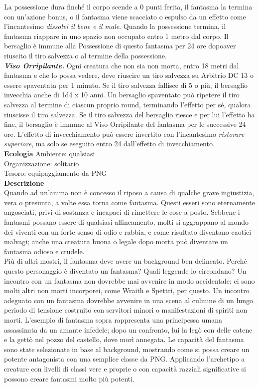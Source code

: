 \begin{multicols}{2}
La possessione dura finché il corpo scende a 0 punti ferita, il fantasma la termina con un'azione bonus, o il fantasma viene scacciato o espulso da un effetto come l'incantesimo \emph{dissolvi il bene e il male}. Quando la possessione termina, il fantasma riappare in uno spazio non occupato entro 1 metro dal corpo. Il bersaglio è immune alla Possessione di questo fantasma per 24 ore dopoaver riuscito il tiro  salvezza o al termine della possessione.\\

\emph{\textbf{Viso Orripilante.}} Ogni creatura che non sia non morta, entro 18 metri  dal fantasma e che lo possa vedere, deve riuscire un tiro salvezza su Arbitrio DC 13 o essere spaventata per 1 minuto. Se il tiro salvezza  fallisce di 5 o più, il bersaglio invecchia anche di 1d4 x 10 anni. Un  bersaglio spaventato può ripetere il tiro salvezza al termine di ciascun  proprio round, terminando l'effetto per sé, qualora riuscisse il tiro  salvezza. Se il tiro salvezza del bersaglio riesce e per lui l'effetto ha fine, il  bersaglio è immune al Viso Orripilante del fantasma per le successive 24  ore. L'effetto di invecchiamento può essere invertito con l'incantesimo \emph{ristorare superiore}, ma solo se eseguito entro 24 dall'effetto di invecchiamento.\\
\textbf{Ecologia}
Ambiente: qualsiasi\\
Organizzazione: solitario\\
Tesoro: equipaggiamento da PNG\\
\textbf{Descrizione}\\
Quando ad un’anima non è concesso il riposo a causa di qualche grave ingiustizia, vera o presunta, a volte essa torna come fantasma. Questi esseri sono eternamente angosciati, privi di sostanza e incapaci di rimettere le cose a posto. Sebbene i fantasmi possano essere di qualsiasi allineamento, molti si aggrappano al mondo dei viventi con un forte senso di odio e rabbia, e come risultato diventano caotici malvagi; anche una creatura buona o legale dopo morta può diventare un fantasma odioso e crudele.\\

Più di altri mostri, il fantasma deve avere un background ben delineato. Perché questo personaggio è diventato un fantasma? Quali leggende lo circondano? Un incontro con un fantasma non dovrebbe mai avvenire in modo accidentale: ci sono molti altri non morti incorporei, come Wraith e Spettri, per questo. Un incontro adeguato con un fantasma dovrebbe avvenire in una scena al culmine di un lungo periodo di tensione costruito con servitori minori o manifestazioni di spiriti non morti. L’esempio di fantasma sopra rappresenta una principessa umana assassinata da un amante infedele; dopo un confronto, lui la legò con delle catene e la gettò nel pozzo del castello, dove morì annegata. Le capacità del fantasma sono state selezionate in base al background, mostrando come si possa creare un potente antagonista con una semplice classe da PNG. Applicando l’archetipo a creature con livelli di classi vere e proprie o con capacità razziali significative si possono creare fantasmi molto più potenti.\\


\end{multicols}
